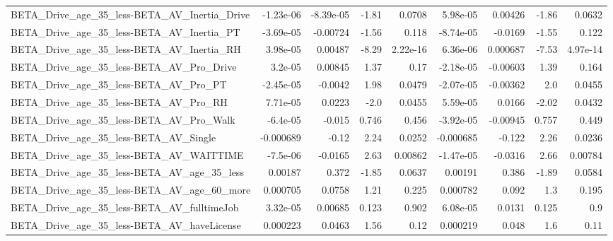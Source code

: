 \begin{tabular}{lrrrrrrrr}
BETA\_Drive\_age\_35\_less-BETA\_AV\_Inertia\_Drive       &   -1.23e-06 &    -8.39e-05 &    -1.81 &   0.0708 &   5.98e-05 &     0.00426 &        -1.86 &        0.0632 \\
BETA\_Drive\_age\_35\_less-BETA\_AV\_Inertia\_PT          &   -3.69e-05 &     -0.00724 &    -1.56 &    0.118 &  -8.74e-05 &     -0.0169 &        -1.55 &         0.122 \\
BETA\_Drive\_age\_35\_less-BETA\_AV\_Inertia\_RH          &    3.98e-05 &      0.00487 &    -8.29 & 2.22e-16 &   6.36e-06 &    0.000687 &        -7.53 &      4.97e-14 \\
BETA\_Drive\_age\_35\_less-BETA\_AV\_Pro\_Drive           &     3.2e-05 &      0.00845 &     1.37 &     0.17 &  -2.18e-05 &    -0.00603 &         1.39 &         0.164 \\
BETA\_Drive\_age\_35\_less-BETA\_AV\_Pro\_PT              &   -2.45e-05 &      -0.0042 &     1.98 &   0.0479 &  -2.07e-05 &    -0.00362 &          2.0 &        0.0455 \\
BETA\_Drive\_age\_35\_less-BETA\_AV\_Pro\_RH              &    7.71e-05 &       0.0223 &     -2.0 &   0.0455 &   5.59e-05 &      0.0166 &        -2.02 &        0.0432 \\
BETA\_Drive\_age\_35\_less-BETA\_AV\_Pro\_Walk            &    -6.4e-05 &       -0.015 &    0.746 &    0.456 &  -3.92e-05 &    -0.00945 &        0.757 &         0.449 \\
BETA\_Drive\_age\_35\_less-BETA\_AV\_Single              &   -0.000689 &        -0.12 &     2.24 &   0.0252 &  -0.000685 &      -0.122 &         2.26 &        0.0236 \\
BETA\_Drive\_age\_35\_less-BETA\_AV\_WAITTIME            &    -7.5e-06 &      -0.0165 &     2.63 &  0.00862 &  -1.47e-05 &     -0.0316 &         2.66 &       0.00784 \\
BETA\_Drive\_age\_35\_less-BETA\_AV\_age\_35\_less         &     0.00187 &        0.372 &    -1.85 &   0.0637 &    0.00191 &       0.386 &        -1.89 &        0.0584 \\
BETA\_Drive\_age\_35\_less-BETA\_AV\_age\_60\_more         &    0.000705 &       0.0758 &     1.21 &    0.225 &   0.000782 &       0.092 &          1.3 &         0.195 \\
BETA\_Drive\_age\_35\_less-BETA\_AV\_fulltimeJob         &    3.32e-05 &      0.00685 &    0.123 &    0.902 &   6.08e-05 &      0.0131 &        0.125 &           0.9 \\
BETA\_Drive\_age\_35\_less-BETA\_AV\_haveLicense         &    0.000223 &       0.0463 &     1.56 &     0.12 &   0.000219 &       0.048 &          1.6 &          0.11 \\

\end{tabular}
